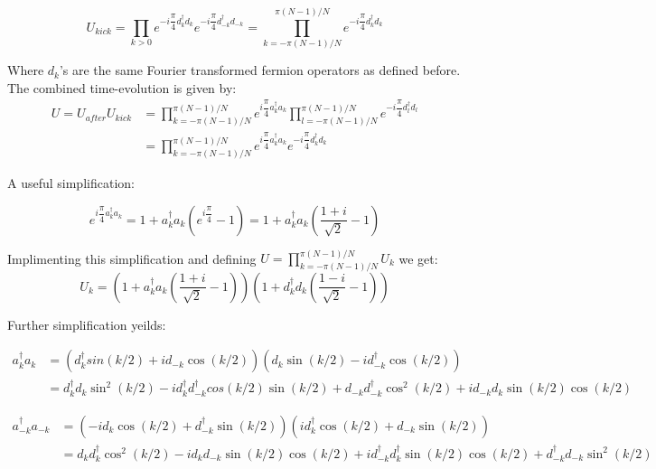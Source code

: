 \documentclass[11pt,a4paper]{article}
\begin{document}
	
		
		\begin{equation}
		U_{kick} = \prod_{k>0} e^{-i\dfrac{\pi}{4}d_{k}^\dagger d_{k}}e^{-i\dfrac{\pi}{4}d_{-k}^\dagger d_{-k}} = \prod_{k=- \pi (N-1)/N}^{ \pi (N-1)/N}e^{-i\dfrac{\pi}{4}d_{k}^\dagger d_{k}} 
		\end{equation}
		
		Where $d_{k}$'s  are the same Fourier transformed fermion  operators as defined before.
		The combined time-evolution is given by:
		\begin{align}
		U = U_{after}U_{kick} &= \prod_{k=- \pi (N-1)/N}^{ \pi (N-1)/N}e^{i\dfrac{\pi}{4} a_{k}^\dagger a_{k}}\prod_{l=- \pi (N-1)/N}^{ \pi (N-1)/N} e^{-i\dfrac{\pi}{4}d_{l}^\dagger d_{l}}\\
		&= \prod_{k=- \pi (N-1)/N}^{ \pi (N-1)/N}e^{i\dfrac{\pi}{4} a_{k}^\dagger a_{k}} e^{-i\dfrac{\pi}{4}d_{k}^\dagger d_{k}}
		\end{align} 
		
		A useful simplification:
		
		\begin{equation}
		e^{i\dfrac{\pi}{4}a_{k}^\dagger a_{k}} = 1 + a_{k}^\dagger a_{k}(e^{i\dfrac{\pi}{4}} -1) = 1 + a_{k}^\dagger a_{k}(\dfrac{1+i}{\sqrt{2}}-1)
		\end{equation}
		
		Implimenting this simplification and defining $U = \prod_{k=- \pi (N-1)/N}^{ \pi (N-1)/N} U_{k}$  we get:
		\begin{equation}
	U_{k} = 	(1 + a_{k}^\dagger a_{k}(\dfrac{1+i}{\sqrt{2}}-1))(1 + d_{k}^\dagger d_{k}(\dfrac{1-i}{\sqrt{2}}-1))
		\end{equation}
		
		Further simplification yeilds:
		
		\begin{align*}
		a_{k}^\dagger a_{k} &= (d_{k}^\dagger sin(k/2) + i d_{-k} \cos(k/2))(d_{k} \sin(k/2) -i d_{-k}^\dagger \cos(k/2)) \\
		&= d_{k}^\dagger d_{k}\sin^2(k/2) -i d_{k}^\dagger d_{-k}^\dagger cos(k/2)\sin(k/2) + d_{-k}d_{-k}^\dagger \cos^2(k/2) +i d_{-k}d_{k} \sin(k/2)\cos(k/2)
		\end{align*}
		
		
	
		\begin{align*}
		a_{-k}^\dagger a_{-k} &= (-id_{k} \cos(k/2)+  d_{-k}^\dagger \sin(k/2))(id_{k}^\dagger \cos(k/2) + d_{-k}\sin(k/2))\\
		&= d_{k}d_{k}^\dagger \cos^2(k/2) -i d_{k}d_{-k}\sin(k/2)\cos(k/2) + id_{-k}^\dagger d_{k}^\dagger \sin(k/2)\cos(k/2) + d_{-k}^\dagger d_{-k} \sin^2(k/2)
		\end{align*}
		
\end{document}
